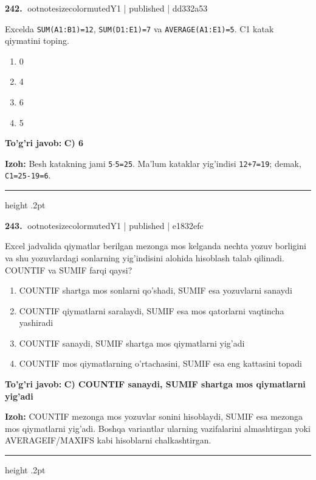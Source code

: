 \documentclass[10pt,a4paper]{article}
\begin{document}
\textbf{\color{ink}242.} {ootnotesizecolor{muted}Y1 | published | dd332a53}
\par
Excelda \texttt{SUM(A1:B1)=12}, \texttt{SUM(D1:E1)=7} va \texttt{AVERAGE(A1:E1)=5}. C1 katak qiymatini toping.
\begin{enumerate}[label=\Alph*),leftmargin=9mm]
\item 0
\item 4
\item 6
\item 5
\end{enumerate}
\begin{tcolorbox}[enhanced,breakable,colback=teal!4,colframe=teal!55!black,boxrule=0.45pt,arc=1.2mm,left=2.8mm,right=2.8mm,top=2mm,bottom=2mm]
\textbf{\color{teal}To'g'ri javob:} \textbf{C) 6}
\par\smallskip
\textbf{Izoh:} Besh katakning jami \texttt{5\ensuremath{\cdot}5=25}. Ma'lum kataklar yig'indisi \texttt{12+7=19}; demak, \texttt{C1=25-19=6}.
\end{tcolorbox}
\vspace{2mm}\hrule height .2pt\vspace{2mm}

\textbf{\color{ink}243.} {ootnotesizecolor{muted}Y1 | published | e1832efc}
\par
Excel jadvalida qiymatlar berilgan mezonga mos kelganda nechta yozuv borligini va shu yozuvlardagi sonlarning yig'indisini alohida hisoblash talab qilinadi. COUNTIF va SUMIF farqi qaysi?
\begin{enumerate}[label=\Alph*),leftmargin=9mm]
\item COUNTIF shartga mos sonlarni qo'shadi, SUMIF esa yozuvlarni sanaydi
\item COUNTIF qiymatlarni saralaydi, SUMIF esa mos qatorlarni vaqtincha yashiradi
\item COUNTIF sanaydi, SUMIF shartga mos qiymatlarni yig'adi
\item COUNTIF mos qiymatlarning o'rtachasini, SUMIF esa eng kattasini topadi
\end{enumerate}
\begin{tcolorbox}[enhanced,breakable,colback=teal!4,colframe=teal!55!black,boxrule=0.45pt,arc=1.2mm,left=2.8mm,right=2.8mm,top=2mm,bottom=2mm]
\textbf{\color{teal}To'g'ri javob:} \textbf{C) COUNTIF sanaydi, SUMIF shartga mos qiymatlarni yig'adi}
\par\smallskip
\textbf{Izoh:} COUNTIF mezonga mos yozuvlar sonini hisoblaydi, SUMIF esa mezonga mos qiymatlarni yig'adi. Boshqa variantlar ularning vazifalarini almashtirgan yoki AVERAGEIF/MAXIFS kabi hisoblarni chalkashtirgan.
\end{tcolorbox}
\vspace{2mm}\hrule height .2pt\vspace{2mm}
\end{document}
